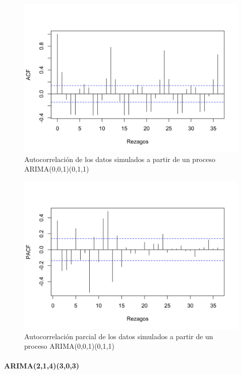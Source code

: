 \documentclass[
]{article}
\begin{document}
\begin{figure}[H]
\includegraphics[width=1\linewidth,height=1\textheight]{Tesis_files/figure-latex/arima001_011_acf-1} \caption{Autocorrelación de los datos simulados a partir de un proceso ARIMA(0,0,1)(0,1,1)}\label{fig:arima001_011_acf}
\end{figure}

\begin{figure}[H]
\includegraphics[width=1\linewidth,height=1\textheight]{Tesis_files/figure-latex/arima001_011_pacf-1} \caption{Autocorrelación parcial de los datos simulados a partir de un proceso ARIMA(0,0,1)(0,1,1)}\label{fig:arima001_011_pacf}
\end{figure}

\paragraph{ARIMA(2,1,4)(3,0,3)}
\end{document}
